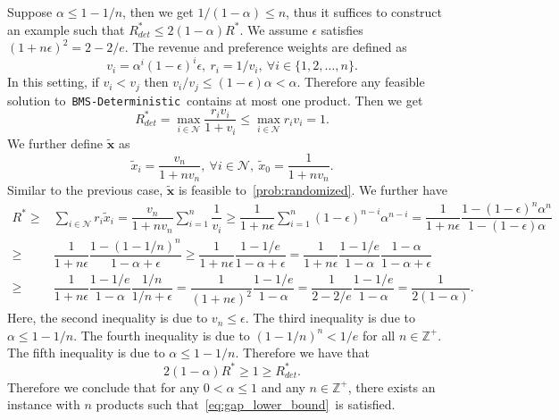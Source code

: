 \documentclass[mnsc,non-blindrev]{informs3}
\theoremstyle{definition}
\begin{document}
\begin{appendices}{\Large{}}
Suppose $\alpha\leq 1-1/n$, then we get $1/(1-\alpha)\leq n$, thus it suffices to construct an example such that $R^*_{det}\leq 2(1-\alpha)R^*$. We assume $\epsilon$ satisfies $(1+n\epsilon)^2=2-2/e$. The revenue and preference weights are defined as
\begin{equation*}
v_i=\alpha^{i}(1-\epsilon)^i\epsilon,\ r_i=1/v_i,\ \forall i\in\{1,2,\dots,n\}.
\end{equation*}
In this setting, if $v_i<v_j$ then $v_i/v_j\leq(1-\epsilon)\alpha<\alpha$. Therefore any feasible solution to~\texttt{BMS-Deterministic}~contains at most one product. Then we get
\begin{equation*}
R^*_{det}=\max_{i\in\mathcal{N}}\dfrac{r_iv_i}{1+v_i}\leq \max_{i\in\mathcal{N}}r_iv_i=1.
\end{equation*}
We further define $\tilde{\bm{x}}$ as
\begin{equation*}
\tilde{x}_i=\dfrac{v_n}{1+nv_n},\ \forall i\in\mathcal{N},\ \tilde{x}_0=\dfrac{1}{1+nv_n}.
\end{equation*}
Similar to the previous case, $\tilde{\bm{x}}$ is feasible to~\ref{prob:randomized}. We further have
\begin{align*}
R^*\geq&\sum_{i\in\mathcal{N}}r_i\tilde{x}_i=\dfrac{v_n}{1+nv_n}\sum_{i=1}^n \dfrac{1}{v_i}\geq \dfrac{1}{1+n\epsilon}\sum_{i=1}^n (1-\epsilon)^{n-i}\alpha^{n-i}=\dfrac{1}{1+n\epsilon}\dfrac{1-(1-\epsilon)^n\alpha^n}{1-(1-\epsilon)\alpha}\\
\geq&\dfrac{1}{1+n\epsilon}\dfrac{1-(1-1/n)^n}{1-\alpha+\epsilon}\geq\dfrac{1}{1+n\epsilon}\dfrac{1-1/e}{1-\alpha+\epsilon}=\dfrac{1}{1+n\epsilon}\dfrac{1-1/e}{1-\alpha}\dfrac{1-\alpha}{1-\alpha+\epsilon}\\
\geq&\dfrac{1}{1+n\epsilon}\dfrac{1-1/e}{1-\alpha}\dfrac{1/n}{1/n+\epsilon}=\dfrac{1}{(1+n\epsilon)^2}\dfrac{1-1/e}{1-\alpha}=\dfrac{1}{2-2/e}\dfrac{1-1/e}{1-\alpha}=\dfrac{1}{2(1-\alpha)}.
\end{align*}
Here, the second inequality is due to $v_n\leq \epsilon$. The third inequality is due to $\alpha\leq 1-1/n$. The fourth inequality is due to $(1-1/n)^n<1/e$ for all $n\in\mathbb{Z}^+$. The fifth inequality is due to $\alpha\leq 1-1/n$. Therefore we have that
\begin{equation}
2(1-\alpha)R^*\geq 1\geq R^*_{det}.
\end{equation}
Therefore we conclude that for any $0<\alpha\leq 1$ and any $n\in\mathbb{Z}^+$, there exists an instance with $n$ products such that~\eqref{eq:gap_lower_bound}~is satisfied.


\end{appendices}
\end{document}
